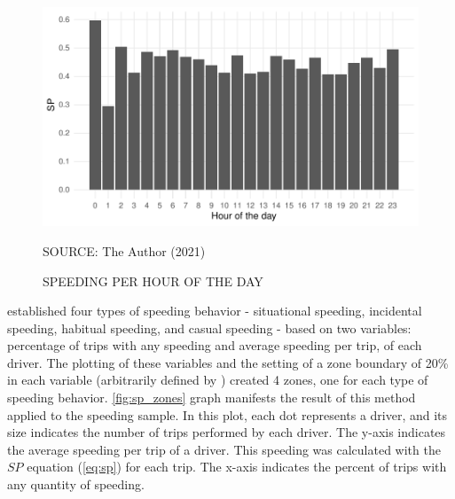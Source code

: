 \begin{figure}[!htbp]
    \centering\footnotesize
    \captionsetup{font=footnotesize}
    \caption{SPEEDING PER HOUR OF THE DAY}
    \includegraphics{fig/hotd_sp.pdf}
    \label{fig:hotd_sp}
    \par SOURCE: The Author (2021)
\end{figure}


\textcite{Richard2013a} established four types of speeding behavior - situational speeding, incidental speeding, habitual speeding, and casual speeding - based on two variables: percentage of trips with any speeding and average speeding per trip, of each driver. The plotting of these variables and the setting of a zone boundary of 20\% in each variable (arbitrarily defined by \textcite{Richard2013a}) created 4 zones, one for each type of speeding behavior. \autoref{fig:sp_zones} graph manifests the result of this method applied to the speeding sample. In this plot, each dot represents a driver, and its size indicates the number of trips performed by each driver. The y-axis indicates the average speeding per trip of a driver. This speeding was calculated with the $SP$ equation (\ref{eq:sp}) for each trip. The x-axis indicates the percent of trips with any quantity of speeding.

